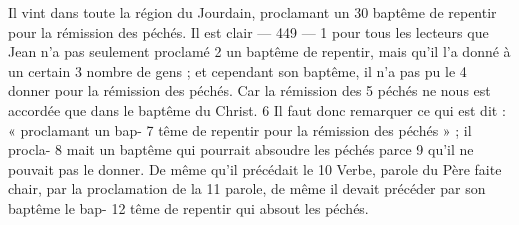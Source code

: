 Il vint dans toute la région du Jourdain, proclamant un	 
30	 	baptême de repentir pour la rémission des péchés. Il est clair	 
 	--- 449 ---	 
1	 	pour tous les lecteurs que Jean n'a pas seulement proclamé	 
2	 	un baptême de repentir, mais qu'il l'a donné à un certain	 
3	 	nombre de gens ; et cependant son baptême, il n'a pas pu le	 
4	 	donner pour la rémission des péchés. Car la rémission des	 
5	 	péchés ne nous est accordée que dans le baptême du Christ.	 
6	 	Il faut donc remarquer ce qui est dit : « proclamant un bap-	 
7	 	tême de repentir pour la rémission des péchés » ; il procla-	 
8	 	mait un baptême qui pourrait absoudre les péchés parce	 
9	 	qu'il ne pouvait pas le donner. De même qu'il précédait le	 
10	 	Verbe, parole du Père faite chair, par la proclamation de la	 
11	 	parole, de même il devait précéder par son baptême le bap-	 
12	 	tême de repentir qui absout les péchés.